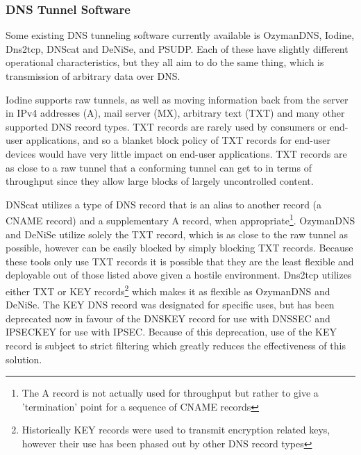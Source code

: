 \documentclass[12pt]{report}
\theoremstyle{remark}
\theoremstyle{definition}
\theoremstyle{definition}
\theoremstyle{definition}
\begin{document}
\subsubsection{DNS Tunnel Software}
\label{tunnels-existing}
Some existing DNS tunneling software currently available is OzymanDNS\cite{ozymandnssrc},
Iodine\cite{iodinesrc}, Dns2tcp\cite{dns2tcpsrc}, DNScat\cite{dnscatsrc} and
DeNiSe\cite{denisesrc}, and PSUDP\cite{psudpsrc}. Each of these have slightly
different operational characteristics, but they all aim to do the same thing,
which is transmission of arbitrary data over DNS.

Iodine supports raw tunnels, as well as moving information back from the server
in IPv4 addresses (A), mail server (MX), arbitrary text (TXT) and many other
supported DNS record types. TXT records are rarely used by consumers or end-user
applications, and so a blanket block policy of TXT records for end-user devices
would have very little impact on end-user applications. TXT records are as close
to a raw tunnel that a conforming tunnel can get to in terms of throughput since
they allow large blocks of largely uncontrolled content.

DNScat utilizes a type of DNS record that is an alias to another record (a CNAME
record) and a supplementary A record, when appropriate\footnote{The A record is
not actually used for throughput but rather to give a 'termination' point for a
sequence of CNAME records}. OzymanDNS and DeNiSe utilize solely the TXT record,
which is as close to the raw tunnel as possible, however can be easily blocked
by simply blocking TXT records. Because these tools only use TXT records it is
possible that they are the least flexible and deployable out of those listed
above given a hostile environment. Dns2tcp utilizes either TXT or KEY
records\footnote{Historically KEY records were used to transmit encryption
related keys, however their use has been phased out by other DNS record types}
which makes it as flexible as OzymanDNS and DeNiSe. The KEY DNS record was
designated for specific uses\cite{rfc2931}, but has been deprecated
now\cite{rfc3445} in favour of the DNSKEY record for use with
DNSSEC\cite{rfc3755} and IPSECKEY for use with IPSEC\cite{rfc4025}. Because of
this deprecation, use of the KEY record is subject to strict filtering which
greatly reduces the effectiveness of this solution.
\end{document}

